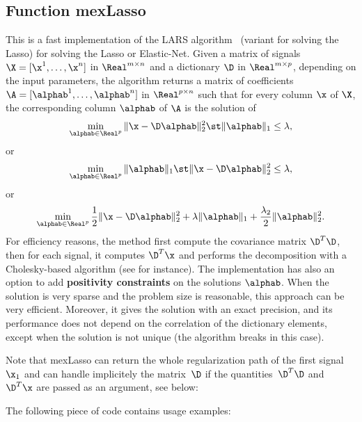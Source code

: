 \documentclass[a4paper, 11pt]{article}
\begin{document}
\subsection{Function mexLasso}
This is a fast implementation of the LARS algorithm~\cite{efron} (variant for solving the Lasso) for solving the Lasso or Elastic-Net. Given a matrix of signals $\X=[\x^1,\ldots,\x^n]$  in $\Real^{m \times n}$ and a dictionary $\D$ in $\Real^{m \times p}$, depending on the input parameters, the algorithm returns a matrix of coefficients $\A=[\alphab^1,\ldots,\alphab^n]$ in $\Real^{p \times n}$ such that for every column $\x$ of $\X$, the corresponding column $\alphab$ of $\A$ is the solution of
\begin{equation}
\min_{\alphab \in \Real^p} \|\x-\D\alphab\|_2^2 \st \|\alphab\|_1 \leq \lambda,
   \end{equation}
   or 
   \begin{equation}
   \min_{\alphab \in \Real^p}  \|\alphab\|_1 \st \|\x-\D\alphab\|_2^2 \leq \lambda, \label{eq:lasso2}
   \end{equation}
   or
   \begin{equation}
   \min_{\alphab \in \Real^p} \frac{1}{2}\|\x-\D\alphab\|_2^2 + \lambda \|\alphab\|_1 + \frac{\lambda_2}{2}\|\alphab\|_2^2. \label{eq:lasso}
   \end{equation}
   For efficiency reasons, the method first compute the covariance matrix $\D^T\D$, then
   for each signal, it computes $\D^T\x$ and performs the decomposition with a
   Cholesky-based algorithm (see \cite{efron} for instance).  The implementation
   has also an option to add {\bf positivity constraints} on the solutions
   $\alphab$.  When the solution is very sparse and the problem size is
   reasonable, this approach can be very efficient. Moreover, it gives the
   solution with an exact precision, and its performance does not depend on the
   correlation of the dictionary elements, except when the solution is not unique
   (the algorithm breaks in this case).

   Note that mexLasso can return the whole regularization path of the first signal $\x_1$ 
   and can handle implicitely the matrix~$\D$ if the quantities~$\D^T\D$ and~$\D^T\x$ are passed
   as an argument, see below:

%    

The following piece of code contains usage examples:

\end{document}
